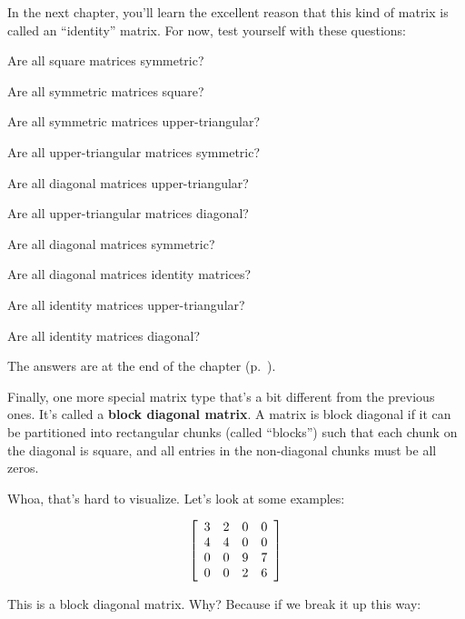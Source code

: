 In the next chapter, you'll learn the excellent reason that this kind of matrix
is called an ``identity'' matrix. For now, test yourself with these questions:

\begin{compactenum}
\label{specialMatrixQuiz}
\item Are all square matrices symmetric?
\item Are all symmetric matrices square?
\item Are all symmetric matrices upper-triangular?
\item Are all upper-triangular matrices symmetric?
\item Are all diagonal matrices upper-triangular?
\item Are all upper-triangular matrices diagonal?
\item Are all diagonal matrices symmetric?
\item Are all diagonal matrices identity matrices?
\item Are all identity matrices upper-triangular?
\item Are all identity matrices diagonal?
\end{compactenum}

The answers are at the end of the chapter (p.~\pageref{specialMatrixQuizSols}).

\bigskip

Finally, one more special matrix type that's a bit different from the previous
ones. It's called a \textbf{block diagonal matrix}. A matrix is block diagonal
if it can be partitioned into rectangular chunks (called ``blocks'') such that
each chunk on the diagonal is square, and all entries in the non-diagonal
chunks must be all zeros.

Whoa, that's hard to visualize. Let's look at some examples:

\vspace{-.15in}
\begin{align*}
\mleft[
\begin{array}{cccc}
3 & 2 & 0 & 0\\
4 & 4 & 0 & 0\\
0 & 0 & 9 & 7 \\
0 & 0 & 2 & 6 \\
\end{array}
\mright]
\end{align*}
\vspace{-.15in}

This is a block diagonal matrix. Why? Because if we break it up this way:

